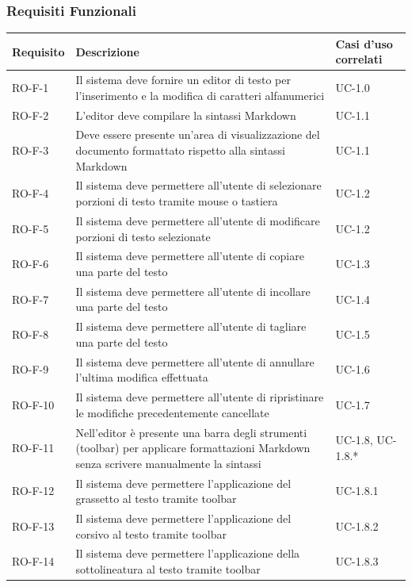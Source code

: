 \documentclass[11pt,a4paper]{article}
\begin{document}
\subsubsection{Requisiti Funzionali}
\begin{longtable}{|p{}|>{\raggedright\arraybackslash}p{}|p{}|}
\hline
\textbf{Requisito} & \textbf{Descrizione} & \textbf{Casi d'uso correlati}\\
\hline
\endhead
RO-F-1 & Il sistema deve fornire un editor di testo per l'inserimento e la modifica di caratteri alfanumerici & UC-1.0 \\
\hline
RO-F-2 & L'editor deve compilare la sintassi Markdown & UC-1.1 \\
\hline
RO-F-3 & Deve essere presente un'area di visualizzazione del documento formattato rispetto alla sintassi Markdown & UC-1.1 \\
\hline
RO-F-4 & Il sistema deve permettere all'utente di selezionare porzioni di testo tramite mouse o tastiera & UC-1.2 \\
\hline
RO-F-5 & Il sistema deve permettere all'utente di modificare porzioni di testo selezionate & UC-1.2 \\
\hline
RO-F-6 & Il sistema deve permettere all'utente di copiare una parte del testo & UC-1.3 \\
\hline
RO-F-7 & Il sistema deve permettere all'utente di incollare una parte del testo & UC-1.4 \\
\hline
RO-F-8 & Il sistema deve permettere all'utente di tagliare una parte del testo & UC-1.5 \\
\hline
RO-F-9 & Il sistema deve permettere all'utente di annullare l'ultima modifica effettuata & UC-1.6 \\
\hline
RO-F-10 & Il sistema deve permettere all'utente di ripristinare le modifiche precedentemente cancellate & UC-1.7 \\
\hline
RO-F-11 & Nell'editor è presente una barra degli strumenti (toolbar) per applicare formattazioni Markdown senza scrivere manualmente la sintassi & UC-1.8, UC-1.8.* \\
\hline
RO-F-12 & Il sistema deve permettere l'applicazione del grassetto al testo tramite toolbar & UC-1.8.1 \\
\hline
RO-F-13 & Il sistema deve permettere l'applicazione del corsivo al testo tramite toolbar & UC-1.8.2 \\
\hline
RO-F-14 & Il sistema deve permettere l'applicazione della sottolineatura al testo tramite toolbar & UC-1.8.3 \\

\end{longtable}
\end{document}
